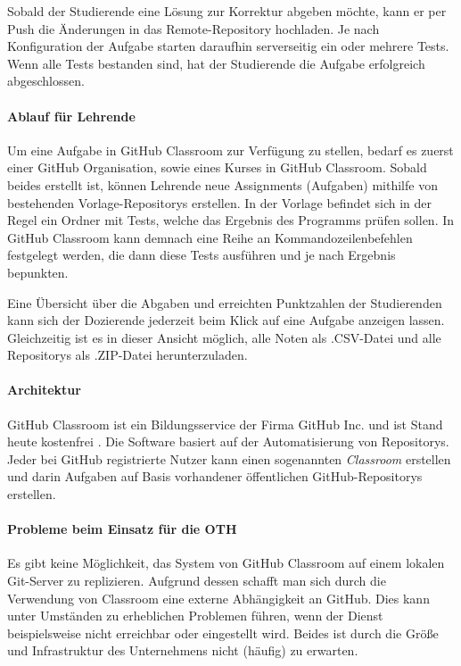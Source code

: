 Sobald der Studierende eine Lösung zur Korrektur abgeben möchte, kann er per
Push die Änderungen in das Remote-Repository hochladen. Je nach Konfiguration
der Aufgabe starten daraufhin serverseitig ein oder mehrere Tests. Wenn alle
Tests bestanden sind, hat der Studierende die Aufgabe erfolgreich abgeschlossen.

\paragraph{Ablauf für Lehrende}
Um eine Aufgabe in GitHub Classroom zur Verfügung zu stellen, bedarf es zuerst
einer GitHub Organisation, sowie eines Kurses in GitHub Classroom. Sobald beides
erstellt ist, können Lehrende neue Assignments (Aufgaben) mithilfe von
bestehenden Vorlage-Repositorys erstellen. In der Vorlage befindet sich in der
Regel ein Ordner mit Tests, welche das Ergebnis des Programms prüfen sollen.
In GitHub Classroom kann demnach eine Reihe an Kommandozeilenbefehlen festgelegt
werden, die dann diese Tests ausführen und je nach Ergebnis bepunkten.

Eine Übersicht über die Abgaben und erreichten Punktzahlen der Studierenden kann
sich der Dozierende jederzeit beim Klick auf eine Aufgabe anzeigen lassen.
Gleichzeitig ist es in dieser Ansicht möglich, alle Noten als .CSV-Datei und
alle Repositorys als .ZIP-Datei herunterzuladen.

\paragraph{Architektur} %
GitHub Classroom ist ein Bildungsservice der Firma GitHub Inc. und ist Stand
heute kostenfrei \parencite{github-classroom-kostenlos}. Die Software basiert
auf der Automatisierung von Repositorys. Jeder bei GitHub registrierte Nutzer
kann einen sogenannten \emph{Classroom} erstellen und darin Aufgaben auf
Basis vorhandener öffentlichen GitHub-Repositorys erstellen.

\paragraph{Probleme beim Einsatz für die OTH}
Es gibt keine Möglichkeit, das System von GitHub Classroom auf einem lokalen
Git-Server zu replizieren. Aufgrund dessen schafft man sich durch die
Verwendung von Classroom eine externe Abhängigkeit an GitHub. Dies kann unter
Umständen zu erheblichen Problemen führen, wenn der Dienst beispielsweise
nicht erreichbar oder eingestellt wird. Beides ist durch die Größe und
Infrastruktur des Unternehmens nicht (häufig) zu erwarten.

